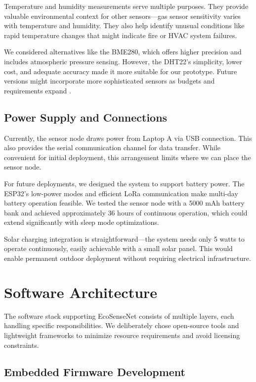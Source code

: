 Temperature and humidity measurements serve multiple purposes. They provide valuable environmental context for other sensors—gas sensor sensitivity varies with temperature and humidity. They also help identify unusual conditions like rapid temperature changes that might indicate fire or HVAC system failures.

We considered alternatives like the BME280, which offers higher precision and includes atmospheric pressure sensing. However, the DHT22's simplicity, lower cost, and adequate accuracy made it more suitable for our prototype. Future versions might incorporate more sophisticated sensors as budgets and requirements expand \cite{sensirion2014dht22}.

\subsection{Power Supply and Connections}

Currently, the sensor node draws power from Laptop A via USB connection. This also provides the serial communication channel for data transfer. While convenient for initial deployment, this arrangement limits where we can place the sensor node.

For future deployments, we designed the system to support battery power. The ESP32's low-power modes and efficient LoRa communication make multi-day battery operation feasible. We tested the sensor node with a 5000 mAh battery bank and achieved approximately 36 hours of continuous operation, which could extend significantly with sleep mode optimizations.

Solar charging integration is straightforward—the system needs only 5 watts to operate continuously, easily achievable with a small solar panel. This would enable permanent outdoor deployment without requiring electrical infrastructure.



\section{Software Architecture}

The software stack supporting EcoSenseNet consists of multiple layers, each handling specific responsibilities. We deliberately chose open-source tools and lightweight frameworks to minimize resource requirements and avoid licensing constraints.

\subsection{Embedded Firmware Development}

